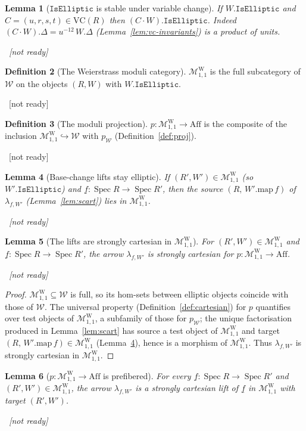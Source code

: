 \documentclass[11pt]{article}
\newcommand{\lean}[1]{\par\smallskip\noindent{\footnotesize\texttt{Lean:\ #1}}\par}
\newcommand{\uses}[1]{}
\newcommand{\notready}{{\footnotesize\textcolor{red!60!black}{\ [not ready]}}}
\theoremstyle{definition}
\newtheorem{definition}{Definition}[section]
\theoremstyle{plain}
\newtheorem{lemma}[definition]{Lemma}
\theoremstyle{remark}
\newcommand{\Aff}{\mathrm{Aff}}
\newcommand{\Spec}{\operatorname{Spec}}
\newcommand{\Weier}{\mathcal{W}}
\newcommand{\MW}{\mathcal{M}^{\mathrm{W}}_{1,1}}
\newcommand{\VC}{\mathrm{VC}}
\newcommand{\map}{\mathrm{map}}
\newcommand{\isEll}{\mathtt{IsElliptic}}
\begin{document}
\begin{lemma}[$\isEll$ is stable under variable change]\label{lem:iselliptic-vc}
If $W.\isEll$ and $C=(u,r,s,t)\in\VC(R)$ then $(C\cdot W).\isEll$.  Indeed
$(C\cdot W).\Delta=u^{-12}\,W.\Delta$ (Lemma~\ref{lem:vc-invariants}) is a product
of units.
\lean{}\notready
\uses{def:iselliptic,lem:vc-invariants,def:vc}
\end{lemma}

\begin{definition}[The Weierstrass moduli category]\label{def:MW}
$\MW$ is the full subcategory of $\Weier$ on the objects $(R,W)$ with $W.\isEll$.
\lean{}\notready
\uses{def:total,def:iselliptic}
\end{definition}

\begin{definition}[The moduli projection]\label{def:MW-proj}
$p:\MW\to\Aff$ is the composite of the inclusion $\MW\hookrightarrow\Weier$ with
$p_{\Weier}$ (Definition~\ref{def:proj}).
\lean{}\notready
\uses{def:MW,def:proj}
\end{definition}

\begin{lemma}[Base-change lifts stay elliptic]\label{lem:MW-lift}
If $(R',W')\in\MW$ (so $W'.\isEll$) and $\underline f:\Spec R\to\Spec R'$, then the
source $(R,\,W'.\map\,f)$ of $\lambda_{f,W'}$ (Lemma~\ref{lem:scart}) lies in
$\MW$.
\lean{}\notready
\uses{def:MW,lem:scart,lem:iselliptic-map}
\end{lemma}

\begin{lemma}[The lifts are strongly cartesian in $\MW$]\label{lem:MW-scart}
For $(R',W')\in\MW$ and $\underline f:\Spec R\to\Spec R'$, the arrow
$\lambda_{f,W'}$ is strongly cartesian for $p:\MW\to\Aff$.
\lean{}\notready
\uses{lem:MW-lift,lem:scart,def:MW}
\end{lemma}
\begin{proof}
$\MW\subseteq\Weier$ is full, so its hom-sets between elliptic objects coincide
with those of $\Weier$.  The universal property (Definition~\ref{def:cartesian})
for $p$ quantifies over test objects of $\MW$, a subfamily of those for
$p_{\Weier}$; the unique factorisation produced in Lemma~\ref{lem:scart} has
source a test object of $\MW$ and target $(R,\,W'.\map\,f)\in\MW$
(Lemma~\ref{lem:MW-lift}), hence is a morphism of $\MW$.  Thus $\lambda_{f,W'}$ is
strongly cartesian in $\MW$.
\end{proof}

\begin{lemma}[$p:\MW\to\Aff$ is prefibered]\label{lem:MW-prefibered}
For every $\underline f:\Spec R\to\Spec R'$ and $(R',W')\in\MW$, the arrow
$\lambda_{f,W'}$ is a strongly cartesian lift of $\underline f$ in $\MW$ with
target $(R',W')$.
\lean{}\notready
\uses{def:isfibered,lem:MW-scart,def:MW-proj}
\end{lemma}
\end{document}
